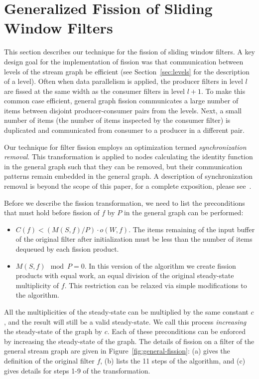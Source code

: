 \section{Generalized Fission of Sliding Window Filters}

This section describes our technique for the fission of sliding window
filters. A key design goal for the implementation of fission 
was that communication between levels of the stream graph be efficient
(see Section~\ref{sec:levels} for the description of a level).  Often
when data parallelism is applied, the producer filters in level $l$ are
fissed at the same width as the consumer filters in level $l + 1$.  To
make this common case efficient, general graph fission communicates a
large number of items between disjoint producer-consumer pairs from the
levels.  Next, a small number of items (the number of items inspected by
the consumer filter) is duplicated and communicated from consumer to a
producer in a different pair.  

Our technique for filter fission employs an optimization termed {\it
  synchronization removal}.  This transformation is applied to nodes
calculating the identity function in the general graph such that they
can be removed, but their communication patterns remain embedded in
the general graph. A description of synchronization removal is beyond
the scope of this paper, for a complete exposition, please
see~\cite{mgordon-phd}.

Before we describe the fission transformation, we need to list the
preconditions that must hold before fission of $f$ by $P$ in the general
graph can be performed:
\begin{itemize}
\item $C(f) < (M(S,f) / P) \cdot o(W, f)$. The items remaining of
  the input buffer of the original filter after initialization must be
  less than the number of items dequeued by each fission product.

\item $M(S,f) \mod P = 0$. In this version of the algorithm we create
  fission products with equal work, an equal division of the original
  steady-state multiplicity of $f$.  This restriction can be relaxed
  via simple modifications to the algorithm.
\end{itemize}
\noindent All the multiplicities of the steady-state can be multiplied
by the same constant $c$, and the result will still be a valid
steady-state.  We call this process {\it increasing} the steady-state
of the graph by $c$.  Each of these preconditions can be enforced by
increasing the steady-state of the graph. The details of fission on a
filter of the general stream graph are given in
Figure~\ref{fig:general-fission}: (a) gives the definition of the
original filter $f$, (b) lists the 11 steps of the algorithm, and
(c) gives details for steps 1-9 of the transformation.

